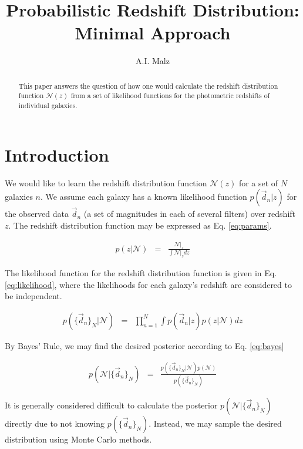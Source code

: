 \documentclass[12pt, onecolumn]{emulateapj}
\begin{document}
\title{Probabilistic Redshift Distribution: Minimal Approach}

\author{A.I. Malz}

\begin{abstract}
This paper answers the question of how one would calculate the redshift distribution function $\mathcal{N}(z)$ from a set of likelihood functions for the photometric redshifts of individual galaxies.
\end{abstract}


\section{Introduction}

We would like to learn the redshift distribution function $\mathcal{N}(z)$ for a set of $N$ galaxies $n$.  We assume each galaxy has a known likelihood function $p(\vec{d}_{n}|z)$ for the observed data $\vec{d}_{n}$ (a set of magnitudes in each of several filters) over redshift $z$.  The redshift distribution function may be expressed as Eq. \ref{eq:params}.

\begin{eqnarray}
\label{eq:params}
p(z|\mathcal{N}) &=& \frac{\mathcal{N}|_{z}}{\int\mathcal{N}|_{z}dz}
\end{eqnarray}

The likelihood function for the redshift distribution function is given in Eq. \ref{eq:likelihood}, where the likelihoods for each galaxy's redshift are considered to be independent.

\begin{eqnarray}
\label{eq:likelihood}
p(\{\vec{d}_{n}\}_{N}|\mathcal{N}) &=& \prod_{n=1}^{N}\int p(\vec{d}_{n}|z)p(z|\mathcal{N})dz
\end{eqnarray}

By Bayes' Rule, we may find the desired posterior according to Eq. \ref{eq:bayes}

\begin{eqnarray}
\label{eq:bayes}
p(\mathcal{N}|\{\vec{d}_{n}\}_{N}) &=& \frac{p(\{\vec{d}_{n}\}_{N}|\mathcal{N})p(\mathcal{N})}{p(\{\vec{d}_{n}\}_{N})}
\end{eqnarray}

It is generally considered difficult to calculate the posterior $p(\mathcal{N}|\{\vec{d}_{n}\}_{N})$ directly due to not knowing $p(\{\vec{d}_{n}\}_{N})$.  Instead, we may sample the desired distribution using Monte Carlo methods.  
\end{document}
